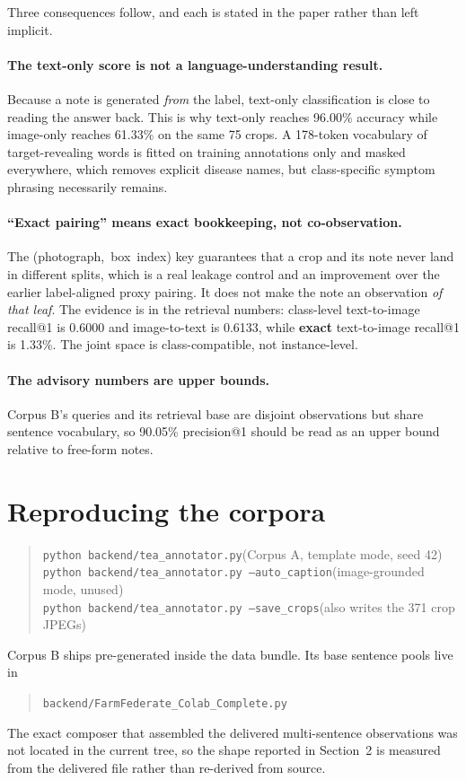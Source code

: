 \documentclass[11pt,a4paper]{article}
\newcommand{\code}[1]{\texttt{\small #1}}
\begin{document}
Three consequences follow, and each is stated in the paper rather than left
implicit.

\paragraph{The text-only score is not a language-understanding result.}
Because a note is generated \emph{from} the label, text-only classification is
close to reading the answer back. This is why text-only reaches 96.00\% accuracy
while image-only reaches 61.33\% on the same 75 crops. A 178-token vocabulary of
target-revealing words is fitted on training annotations only and masked
everywhere, which removes explicit disease names, but class-specific symptom
phrasing necessarily remains.

\paragraph{``Exact pairing'' means exact bookkeeping, not co-observation.}
The \mbox{(photograph, box index)} key guarantees that a crop and its note never
land in different splits, which is a real leakage control and an improvement over
the earlier label-aligned proxy pairing. It does not make the note an observation
\emph{of that leaf}. The evidence is in the retrieval numbers: class-level
text-to-image recall@1 is 0.6000 and image-to-text is 0.6133, while
\textbf{exact} text-to-image recall@1 is 1.33\%. The joint space is
class-compatible, not instance-level.

\paragraph{The advisory numbers are upper bounds.}
Corpus B's queries and its retrieval base are disjoint observations but share
sentence vocabulary, so 90.05\% precision@1 should be read as an upper bound
relative to free-form notes.

\section*{Reproducing the corpora}

\begin{quote}
\code{python backend/tea\_annotator.py}\hfill (Corpus A, template mode, seed 42)\\
\code{python backend/tea\_annotator.py --auto\_caption}\hfill (image-grounded mode, unused)\\
\code{python backend/tea\_annotator.py --save\_crops}\hfill (also writes the 371 crop JPEGs)
\end{quote}

\noindent
Corpus B ships pre-generated inside the data bundle. Its base sentence pools
live in

\begin{quote}
\code{backend/FarmFederate\_Colab\_Complete.py}
\end{quote}

\noindent
The exact composer that assembled the delivered multi-sentence observations was
not located in the current tree, so the shape reported in Section~2 is measured
from the delivered file rather than re-derived from source.
\end{document}
